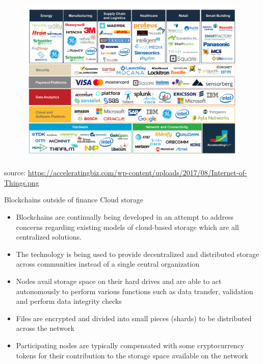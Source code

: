 \documentclass[11pt]{beamer}
\begin{document}
\begin{frame}
	\begin{figure}[]
		\centering
		\includegraphics  [scale=0.2]{Images/iot-ecosystem1}
	\end{figure}
	\begin{scriptsize}
		source: \href{https://acceleratingbiz.com/proof-point/internet-things-iot-overview-selected-devices/}{https://acceleratingbiz.com/wp-content/uploads/2017/08/Internet-of-Things.png}
	\end{scriptsize}
\end{frame}


\begin{frame}{Blockchains outside of finance}
	Cloud storage
	\begin{itemize}
		\item Blockchains are continually being developed in an attempt to address concerns regarding existing models of cloud-based storage which are all centralized solutions.
		\item The technology is being used to provide decentralized and distributed storage across communities instead of a single central organization
		\item Nodes avail storage space on their hard drives and are able to act autonomously to perform various functions such as data transfer, validation and perform data integrity checks
		\item Files are encrypted and divided into small pieces (shards) to be distributed across the network
		\item Participating nodes are typically compensated with some cryptocurrency tokens for their contribution to the storage space available on the network
	\end{itemize}
\end{frame}
\end{document}
